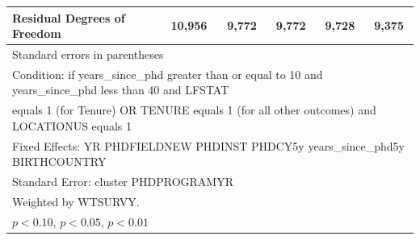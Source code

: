 \begin{table}[htbp]
\begin{tabular}{l*{5}{c}}
Residual Degrees of Freedom&      10,956         &       9,772         &       9,772         &       9,728         &       9,375         \\
\hline\hline
\multicolumn{6}{l}{\footnotesize Standard errors in parentheses}\\
\multicolumn{6}{l}{\footnotesize Condition: if years\_since\_phd greater than or equal to 10 and years\_since\_phd less than 40 and LFSTAT}\\
\multicolumn{6}{l}{\footnotesize equals 1 (for Tenure) OR TENURE equals 1 (for all other outcomes) and LOCATIONUS equals 1}\\
\multicolumn{6}{l}{\footnotesize Fixed Effects: YR PHDFIELDNEW PHDINST PHDCY5y years\_since\_phd5y BIRTHCOUNTRY}\\
\multicolumn{6}{l}{\footnotesize Standard Error: cluster PHDPROGRAMYR}\\
\multicolumn{6}{l}{\footnotesize Weighted by WTSURVY.}\\
\multicolumn{6}{l}{\footnotesize \sym{*} \(p<0.10\), \sym{**} \(p<0.05\), \sym{***} \(p<0.01\)}\\
\end{tabular}
\end{table}
